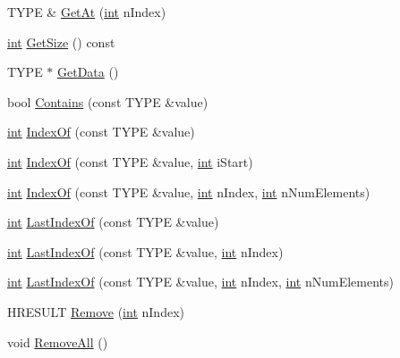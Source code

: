 \begin{DoxyCompactItemize}
\item 
TYPE \& \hyperlink{class_c_growable_array_ac9d62b83d40b9a8f974ae0e47d108e42}{GetAt} (\hyperlink{_d_x_u_tgui_8cpp_a2d77ed03302b6978834ee3b6f57837fb}{int} nIndex)
\item 
\hyperlink{_d_x_u_tgui_8cpp_a2d77ed03302b6978834ee3b6f57837fb}{int} \hyperlink{class_c_growable_array_ab8be085b33e3698b96dacfa8bcb5f7ee}{GetSize} () const 
\item 
TYPE $\ast$ \hyperlink{class_c_growable_array_ab3d75c2f7eca8b3c49f63932bd8ae5bb}{GetData} ()
\item 
bool \hyperlink{class_c_growable_array_a0b48a56bedc0c6e00e7eede32d29e752}{Contains} (const TYPE \&value)
\item 
\hyperlink{_d_x_u_tgui_8cpp_a2d77ed03302b6978834ee3b6f57837fb}{int} \hyperlink{class_c_growable_array_a25e5e002fc8960491e350861d690c76b}{IndexOf} (const TYPE \&value)
\item 
\hyperlink{_d_x_u_tgui_8cpp_a2d77ed03302b6978834ee3b6f57837fb}{int} \hyperlink{class_c_growable_array_a0a9c399665f3901d6c949f4f4f334208}{IndexOf} (const TYPE \&value, \hyperlink{_d_x_u_tgui_8cpp_a2d77ed03302b6978834ee3b6f57837fb}{int} iStart)
\item 
\hyperlink{_d_x_u_tgui_8cpp_a2d77ed03302b6978834ee3b6f57837fb}{int} \hyperlink{class_c_growable_array_a85097aa77eaee15de0d8184bff5899f9}{IndexOf} (const TYPE \&value, \hyperlink{_d_x_u_tgui_8cpp_a2d77ed03302b6978834ee3b6f57837fb}{int} nIndex, \hyperlink{_d_x_u_tgui_8cpp_a2d77ed03302b6978834ee3b6f57837fb}{int} nNumElements)
\item 
\hyperlink{_d_x_u_tgui_8cpp_a2d77ed03302b6978834ee3b6f57837fb}{int} \hyperlink{class_c_growable_array_aaff681306d8ac4a490d7bca720f2a51a}{LastIndexOf} (const TYPE \&value)
\item 
\hyperlink{_d_x_u_tgui_8cpp_a2d77ed03302b6978834ee3b6f57837fb}{int} \hyperlink{class_c_growable_array_a36b8cf1c09ad2672174e9943d60f7d47}{LastIndexOf} (const TYPE \&value, \hyperlink{_d_x_u_tgui_8cpp_a2d77ed03302b6978834ee3b6f57837fb}{int} nIndex)
\item 
\hyperlink{_d_x_u_tgui_8cpp_a2d77ed03302b6978834ee3b6f57837fb}{int} \hyperlink{class_c_growable_array_a117caee552de4bae643d0e059266a8d2}{LastIndexOf} (const TYPE \&value, \hyperlink{_d_x_u_tgui_8cpp_a2d77ed03302b6978834ee3b6f57837fb}{int} nIndex, \hyperlink{_d_x_u_tgui_8cpp_a2d77ed03302b6978834ee3b6f57837fb}{int} nNumElements)
\item 
HRESULT \hyperlink{class_c_growable_array_ad8d75650829296f666f9c1f099f505a4}{Remove} (\hyperlink{_d_x_u_tgui_8cpp_a2d77ed03302b6978834ee3b6f57837fb}{int} nIndex)
\item 
void \hyperlink{class_c_growable_array_a1ab980cfe0dd1733f1bce0d7a2880e2d}{RemoveAll} ()
\end{DoxyCompactItemize}
